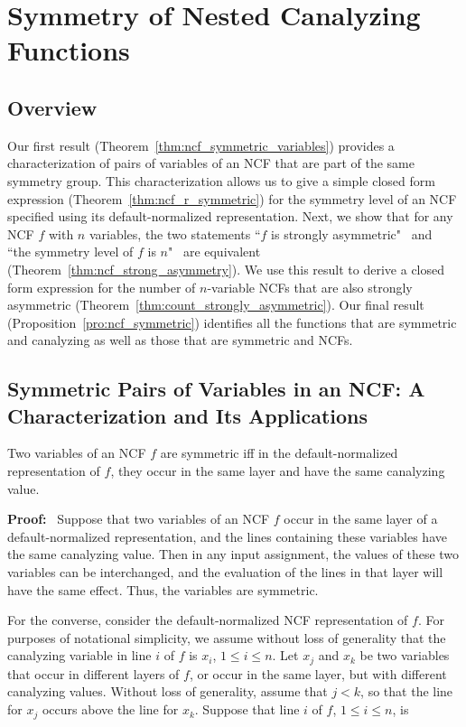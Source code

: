 \section{Symmetry of Nested Canalyzing Functions}
\label{sec:ncf_and_symmetry}

\subsection{Overview}
\label{sse:res_overview}
Our first result (Theorem~\ref{thm:ncf_symmetric_variables})
provides a characterization of pairs of variables of an NCF
that are part of the same symmetry group. 
This characterization allows us to give a simple closed form
expression (Theorem~\ref{thm:ncf_r_symmetric}) 
for the symmetry level of an NCF specified using
its default-normalized representation.
Next, we show that for any NCF $f$ with $n$ variables,
the two statements ``$f$ is strongly asymmetric" ~and~
``the symmetry level of $f$ is $n$"~ are equivalent 
(Theorem~\ref{thm:ncf_strong_asymmetry}).
We use this result to derive a closed form expression 
for the number of $n$-variable NCFs that are 
also strongly asymmetric (Theorem~\ref{thm:count_strongly_asymmetric}).
Our final result (Proposition~\ref{pro:ncf_symmetric})
identifies all the functions that are symmetric and
canalyzing as well as those that are symmetric and NCFs.

\subsection{Symmetric Pairs of Variables in an NCF: A Characterization
and Its Applications}
\label{sse:ncf_strong_sym}

\begin{theorem}\label{thm:ncf_symmetric_variables}
Two variables of an NCF $f$ are symmetric iff
in the default-normalized representation of $f$,
they occur in the same layer and have the same canalyzing value.
\end{theorem}
\noindent
\textbf{Proof:}~
Suppose that two variables of an NCF $f$ occur in the same layer of a
default-normalized representation, and the lines containing these variables
have the same canalyzing value.  Then in any input assignment, the
values of these two variables can be interchanged, and the evaluation
of the lines in that layer will have the same effect.  Thus, the
variables are symmetric.

For the converse, consider the default-normalized NCF representation of $f$. 
For purposes of notational simplicity, we assume without loss of generality that the
canalyzing variable in line $i$ of $f$ is $x_i$, $1 \leq i \leq n$.
Let  $x_j$ and $x_k$ be two variables that occur in different
layers of $f$, or occur in the same layer, but with different
canalyzing values.  Without loss of generality, 
assume that $j < k$, so that the line for
$x_j$ occurs above the line for $x_k$.
Suppose that line $i$ of $f$, $1 \leq i \leq n$, is 

